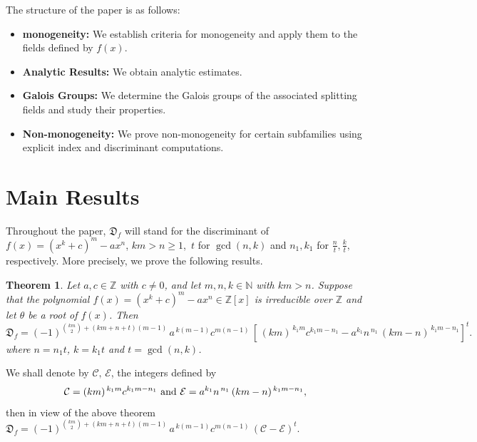 \documentclass[table]{amsart}
\newtheorem{theorem}{Theorem}[section]
\newcommand{\D}{\mathfrak{D}}
\newcommand{\calC}{\mathcal{C}}
\newcommand{\calE}{\mathcal{E}}
\numberwithin{equation}{section}
\begin{document}
The structure of the paper is as follows:
\begin{itemize}
    \item \textbf{monogeneity:} We establish criteria for monogeneity and apply them to the fields defined by $f(x)$.
    \item \textbf{Analytic Results:} We obtain analytic estimates.
    \item \textbf{Galois Groups:} We determine the Galois groups of the associated splitting fields and study their properties.
    \item \textbf{Non-monogeneity:} We prove non-monogeneity for certain subfamilies using explicit index and discriminant computations.
\end{itemize}

\fi

\section{Main Results}
Throughout the paper, $\D_f$ will stand for the discriminant  of  $f(x)=(x^k+c)^m-ax^n$, $km > n \geq 1$,~$t$ for $\gcd(n,k)$ and $n_1, k_1$ for $\frac{n}{t}, \frac{k}{t},$ respectively. More precisely, we prove the following results. 
\begin{theorem} \label{disc of f(x)}
Let $a,c \in \mathbb{Z}$ with $c \neq 0$, and let $m,n,k \in \mathbb{N}$ with $km>n$. 
Suppose that the polynomial $f(x) = (x^k + c)^m - a x^n \in \mathbb{Z}[x]$ is irreducible over $\mathbb{Z}$ and let $\theta$ be a root of $f(x)$. Then %
\begin{equation}
    \D_f
=(-1)^{\binom{km}{2}+(km+n+t)(m-1)}\,a^{\,k(m-1)}c^{m(n-1)}\,
\left[\,(km)^{\,k_1m}c^{k_1m-n_1} - a^{k_1}n^{\,n_1}\,(km-n)^{\,k_1m-n_1}\right]^{t}.
\end{equation}
where $n = n_1 t$, $k = k_1 t$ and $t=\gcd(n,k)$.
\end{theorem}
We shall denote by $\calC,\, \calE$, the integers defined by
\begin{equation}\label{CE}
	\calC=(km)^{\,k_1m}c^{k_1m-n_1}  ~{\rm and}  ~\calE= a^{k_1}n^{\,n_1}\,(km-n)^{\,k_1m-n_1},
\end{equation}
then in view of the above theorem $\D_f = (-1)^{\binom{km}{2}+(km+n+t)(m-1)}\,a^{\,k(m-1)}c^{m(n-1)}\,(\calC-\calE)^{t}.$
\end{document}

